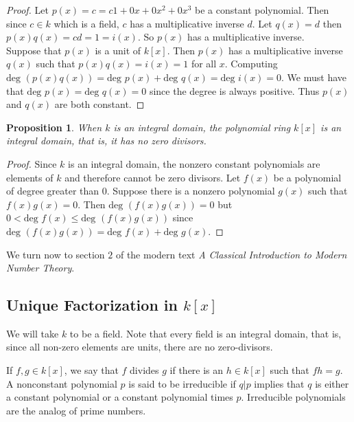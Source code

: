 \documentclass{article}
\theoremstyle{problemstyle}
\newtheorem{proposition}{Proposition}
\begin{document}
\begin{proof}
Let $p(x) = c = c1 + 0x +0x^2 + 0x^3$ be a constant polynomial. Then since $c \in k$ which is a field, $c$ has a multiplicative inverse $d$. Let $q(x) = d$ then $p(x)q(x) = cd = 1 = i(x)$. So $p(x)$ has a multiplicative inverse.\\

Suppose that $p(x)$ is a unit of $k[x]$. Then $p(x)$ has a multiplicative inverse $q(x)$ such that $p(x)q(x) = i(x) = 1$ for all $x$. Computing $\text{deg }(p(x)q(x)) = \text{deg }p(x) + \text{deg }q(x) = \text{deg }i(x) = 0$. We must have that $\text{deg }p(x) = \text{deg }q(x) = 0$ since the degree is always positive. Thus $p(x)$ and $q(x)$ are both constant. 
\end{proof}

\begin{proposition}
When $k$ is an integral domain, the polynomial ring $k[x]$ is an integral domain, that is, it has no zero divisors. 
\end{proposition}

\begin{proof}
Since $k$ is an integral domain, the nonzero constant polynomials are elements of $k$ and therefore cannot be zero divisors. Let $f(x)$ be a polynomial of degree greater than $0$. Suppose there is a nonzero polynomial $g(x)$ such that $f(x)g(x) = 0$. Then $\text{deg }(f(x)g(x)) = 0$ but $0< \text{deg }f(x) \leq \text{deg }(f(x)g(x))$ since $\text{deg }(f(x)g(x)) = \text{deg }f(x) + \text{deg }g(x)$. 
\end{proof}

We turn now to section $2$ of the modern text \textit{A Classical Introduction to Modern Number Theory}. 

\subsection*{Unique Factorization in $k[x]$}
\setcounter{proposition}{0}
\setcounter{definition}{0}

We will take $k$ to be a field. Note that every field is an integral domain, that is, since all non-zero elements are units, there are no zero-divisors. 

If $f,g \in k[x]$, we say that $f$ divides $g$ if there is an $h \in k[x]$ such that $fh = g$. A nonconstant polynomial $p$ is said to be irreducible if $q|p$ implies that $q$ is either a constant polynomial or a constant polynomial times $p$. Irreducible polynomials are the analog of prime numbers. 
\end{document}
